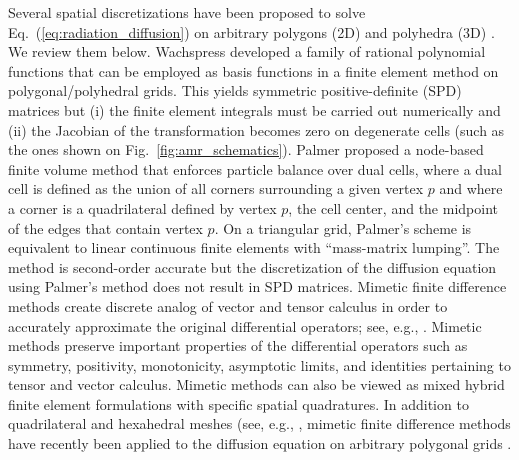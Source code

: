 \documentclass[preprint,10pt]{elsarticle}
\newcommand{\eqt}[1]{Eq.~(\ref{#1})}                     %
\newcommand{\fig}[1]{Fig.~\ref{#1}}                      %
\renewcommand{\(}{\left(}
\renewcommand{\)}{\right)}
\renewcommand{\[}{\left[}
\renewcommand{\]}{\right]}
\begin{document}
Several spatial discretizations have been proposed to solve \eqt{eq:radiation_diffusion} on
arbitrary polygons (2D) and polyhedra (3D) \cite{Wachspress1975,Kuznetsov2004,Palmer2005,Brezzi2005,
LipnikovShashkovSvyatskiy2006,Bailey2008a}. We review them below.
%
Wachspress \cite{Wachspress1975} developed a family of rational polynomial functions that can be employed
as basis functions in a finite element method on polygonal/polyhedral grids. This yields
symmetric positive-definite (SPD) matrices but (i) the finite element integrals must be carried out 
numerically and (ii) the Jacobian of the transformation becomes zero on degenerate cells 
(such as the ones shown on \fig{fig:amr_schematics}). 
%
Palmer \cite{Palmer2005,PalmerLLNL} proposed a node-based finite volume method 
that enforces particle balance over dual cells, where a dual cell is defined as 
the union of all corners surrounding a given vertex $p$ and where  a corner 
is a quadrilateral defined by vertex $p$, the cell center, and the midpoint
of the edges that contain vertex $p$. On a triangular grid, Palmer's scheme is equivalent 
to linear continuous finite elements with ``mass-matrix lumping''. The method is 
second-order accurate but the discretization of the diffusion equation using Palmer's method 
does not result in SPD matrices.
%
Mimetic finite difference methods create discrete analog of vector and tensor
calculus in order to accurately approximate the original differential operators;
see, e.g., \cite{HymanMorelShashkovSteinberg2002}.
Mimetic methods preserve important properties of the differential operators such 
as symmetry, positivity, monotonicity, asymptotic limits, and identities pertaining 
to tensor and vector calculus. Mimetic methods can also be viewed as mixed hybrid 
finite element formulations with specific spatial quadratures.  
In addition to quadrilateral and hexahedral meshes (see, e.g., 
\cite{MorelRobertsShashkov1998,MorelHallShashkov2001}, mimetic finite difference 
methods have recently been applied to the diffusion equation on arbitrary polygonal 
grids \cite{Kuznetsov2004,Brezzi2005,LipnikovShashkovSvyatskiy2006,LipnikovShashkov2010}.
\end{document}
